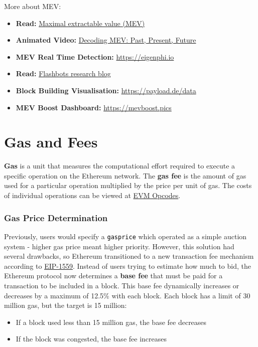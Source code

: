 \documentclass[12pt]{article}
\newcommand{\codegrey}[1]{%
  \texttt{\colorbox{black!4}{\textcolor{black}{#1}}}%
}
\begin{document}
\medskip
\noindent
More about MEV:
\begin{itemize}
  \item \textbf{Read:} \href{https://ethereum.org/en/developers/docs/mev/}{Maximal extractable value (MEV)}
  \item \textbf{Animated Video:} \href{https://www.youtube.com/watch?v=F9IuBZGseFQ}{Decoding MEV: Past, Present, Future}
  \item \textbf{MEV Real Time Detection:} \href{https://eigenphi.io/}{https://eigenphi.io}
  \item \textbf{Read:} \href{https://www.flashbots.net/}{Flashbots research blog}
  \item \textbf{Block Building Visualisation:} \href{https://payload.de/data/}{https://payload.de/data}
  \item \textbf{MEV Boost Dashboard:} \href{https://mevboost.pics/}{https://mevboost.pics}
\end{itemize}

\section{Gas and Fees}

\textbf{Gas} is a unit that measures the computational effort required to execute a specific operation on the Ethereum network. The \textbf{gas fee} is the amount of gas used for a particular operation multiplied by the price per unit of gas. The costs of individual operations can be viewed at \href{https://ethereum.org/en/developers/docs/evm/opcodes/}{EVM Opcodes}.

\subsubsection*{Gas Price Determination}

Previously, users would specify a \codegrey{gasprice} which operated as a simple auction system - higher gas price meant higher priority. However, this solution had several drawbacks, so Ethereum transitioned to a new transaction fee mechanism according to \href{https://eips.ethereum.org/EIPS/eip-1559}{EIP-1559}. Instead of users trying to estimate how much to bid, the Ethereum protocol now determines a \textbf{base fee} that must be paid for a transaction to be included in a block. This base fee dynamically increases or decreases by a maximum of 12.5\% with each block. Each block has a limit of 30 million gas, but the target is 15 million:

\begin{itemize}
    \item If a block used less than 15 million gas, the base fee decreases
    \item If the block was congested, the base fee increases
\end{itemize}
\end{document}
